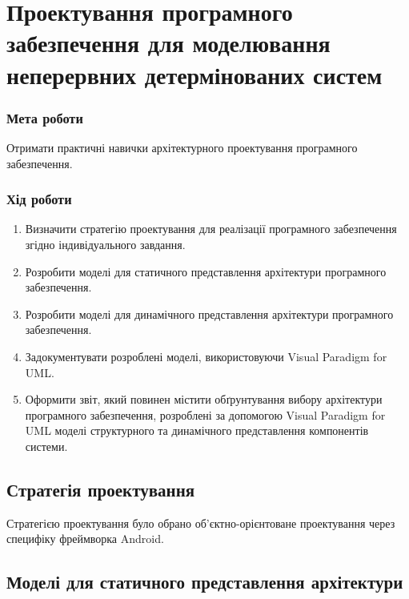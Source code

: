 



\newcommand{\labnumber}{3} %



\lstset{language=Kotlin}
\graphicspath{{figures/}}


\Ukrainian


\addtocounter{page}{1}

\section*{Проектування програмного забезпечення для моделювання неперервних детермінованих систем}
\subsubsection*{Мета роботи}
Отримати практичні навички архітектурного проектування
програмного забезпечення.
\subsubsection*{Хід роботи}
\begin{enumerate}
\item Визначити стратегію проектування для реалізації програмного забезпечення згідно індивідуального завдання.
\item Розробити моделі для статичного представлення архітектури програмного забезпечення.
\item Розробити моделі для динамічного представлення архітектури програмного забезпечення.
\item Задокументувати розроблені моделі, використовуючи Visual Paradigm for UML.
\item Оформити звіт, який повинен містити обґрунтування вибору архітектури програмного забезпечення, розроблені за допомогою Visual Paradigm for UML моделі структурного та динамічного представлення компонентів системи.
\end{enumerate}

\subsection{Стратегія проектування}
Стратегією проектування було обрано об'єктно-орієнтоване проектування через специфіку фреймворка Android.

\subsection{Моделі для статичного представлення архітектури}
